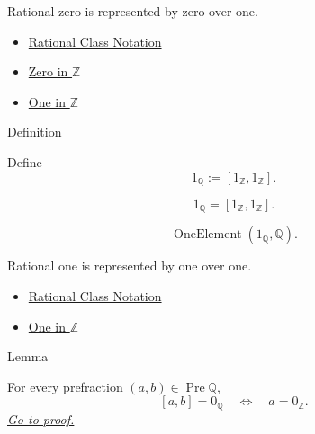 \begin{remark*}[Interpretation]
Rational zero is represented by zero over one.
\end{remark*}

\begin{dependencies}
\begin{itemize}
  \item \hyperref[def:rational-class-notation]{Rational Class Notation}
  \item \hyperref[def:zero-in-z]{Zero in $\mathbb{Z}$}
  \item \hyperref[def:one-in-z]{One in $\mathbb{Z}$}
\end{itemize}
\end{dependencies}

\begin{definitionbox}{Definition}
\begin{definition}
\label{def:one-in-q}
Define
\[
1_{\mathbb{Q}}:=[1_{\mathbb{Z}},1_{\mathbb{Z}}].
\]
\end{definition}
\end{definitionbox}

\begin{remark*}
\[
1_{\mathbb{Q}}=[1_{\mathbb{Z}},1_{\mathbb{Z}}].
\]
\end{remark*}

\begin{remark*}
\[
\operatorname{OneElement}(1_{\mathbb{Q}},\mathbb{Q}).
\]
\end{remark*}

\begin{remark*}[Interpretation]
Rational one is represented by one over one.
\end{remark*}

\begin{dependencies}
\begin{itemize}
  \item \hyperref[def:rational-class-notation]{Rational Class Notation}
  \item \hyperref[def:one-in-z]{One in $\mathbb{Z}$}
\end{itemize}
\end{dependencies}

\begin{lemmabox}{Lemma}
\begin{lemma}
\label{lem:vanishing-criterion-q}
For every prefraction $(a,b)\in\operatorname{Pre}\mathbb{Q}$,
\[
[a,b]=0_{\mathbb{Q}}
\quad\Longleftrightarrow\quad
a=0_{\mathbb{Z}}.
\]
\hyperref[prf:vanishing-criterion-q]{\textit{Go to proof.}}
\end{lemma}
\end{lemmabox}


